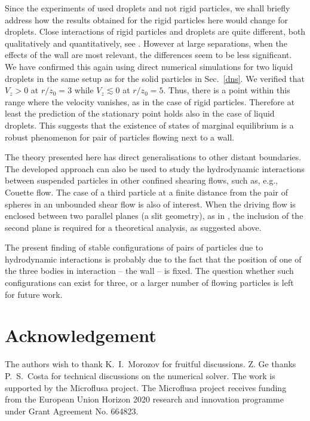 Since the experiments of \cite{tab0,tabeling,flow-assist} used droplets and not rigid particles, we shall briefly address how the results obtained for the rigid particles here would change for droplets. Close interactions of rigid particles and droplets are quite different, both qualitatively and quantitatively, see \eg \cite{kim_karrila}. However at large separations, when the effects of the wall are most relevant, the differences seem to be less significant. We have confirmed this again using direct numerical simulations for two liquid droplets in the same setup as for the solid particles in Sec.~\ref{dns}. We verified that $V_z>0$ at $r/z_0=3$ while $V_z\lesssim 0$ at $r/z_0=5$. Thus, there is a point within this range where the velocity vanishes, as in the case of rigid particles. Therefore at least the prediction of the stationary point holds also in the case of liquid droplets. This suggests that the existence of states of marginal equilibrium is a robust phenomenon for pair of particles flowing next to a wall.

The theory presented here has direct generalisations to other distant boundaries.  The developed approach can also be used to study the hydrodynamic interactions between suspended particles in other confined shearing flows, such as, e.g., Couette flow. The case of a third particle at a finite distance from the pair of spheres in an unbounded shear flow is also of interest. When the driving flow is enclosed between two parallel planes (\ie a slit geometry), as in \cite{zurita-gotor_2007}, the inclusion of the second plane is required for a theoretical analysis, as suggested above.



The present finding of stable configurations of pairs of particles due to hydrodynamic interactions is probably due to the fact that the position of one of the three bodies in interaction -- the wall -- is fixed. The question whether such configurations can exist for three, or a larger number of flowing particles is left for future work.

\section*{Acknowledgement}
The authors wish to thank K.~I.~Morozov for fruitful discussions. Z. Ge thanks P.~S.~Costa for technical discussions on the numerical solver. The work is supported by the Microflusa project. The Microflusa project receives funding from the European Union Horizon 2020 research and innovation programme
under Grant Agreement No. 664823.


